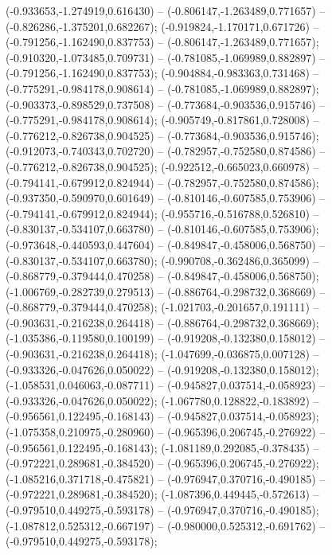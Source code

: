  (-0.933653,-1.274919,0.616430) -- (-0.806147,-1.263489,0.771657) -- (-0.826286,-1.375201,0.682267);
 (-0.919824,-1.170171,0.671726) -- (-0.791256,-1.162490,0.837753) -- (-0.806147,-1.263489,0.771657);
 (-0.910320,-1.073485,0.709731) -- (-0.781085,-1.069989,0.882897) -- (-0.791256,-1.162490,0.837753);
 (-0.904884,-0.983363,0.731468) -- (-0.775291,-0.984178,0.908614) -- (-0.781085,-1.069989,0.882897);
 (-0.903373,-0.898529,0.737508) -- (-0.773684,-0.903536,0.915746) -- (-0.775291,-0.984178,0.908614);
 (-0.905749,-0.817861,0.728008) -- (-0.776212,-0.826738,0.904525) -- (-0.773684,-0.903536,0.915746);
 (-0.912073,-0.740343,0.702720) -- (-0.782957,-0.752580,0.874586) -- (-0.776212,-0.826738,0.904525);
 (-0.922512,-0.665023,0.660978) -- (-0.794141,-0.679912,0.824944) -- (-0.782957,-0.752580,0.874586);
 (-0.937350,-0.590970,0.601649) -- (-0.810146,-0.607585,0.753906) -- (-0.794141,-0.679912,0.824944);
 (-0.955716,-0.516788,0.526810) -- (-0.830137,-0.534107,0.663780) -- (-0.810146,-0.607585,0.753906);
 (-0.973648,-0.440593,0.447604) -- (-0.849847,-0.458006,0.568750) -- (-0.830137,-0.534107,0.663780);
 (-0.990708,-0.362486,0.365099) -- (-0.868779,-0.379444,0.470258) -- (-0.849847,-0.458006,0.568750);
 (-1.006769,-0.282739,0.279513) -- (-0.886764,-0.298732,0.368669) -- (-0.868779,-0.379444,0.470258);
 (-1.021703,-0.201657,0.191111) -- (-0.903631,-0.216238,0.264418) -- (-0.886764,-0.298732,0.368669);
 (-1.035386,-0.119580,0.100199) -- (-0.919208,-0.132380,0.158012) -- (-0.903631,-0.216238,0.264418);
 (-1.047699,-0.036875,0.007128) -- (-0.933326,-0.047626,0.050022) -- (-0.919208,-0.132380,0.158012);
 (-1.058531,0.046063,-0.087711) -- (-0.945827,0.037514,-0.058923) -- (-0.933326,-0.047626,0.050022);
 (-1.067780,0.128822,-0.183892) -- (-0.956561,0.122495,-0.168143) -- (-0.945827,0.037514,-0.058923);
 (-1.075358,0.210975,-0.280960) -- (-0.965396,0.206745,-0.276922) -- (-0.956561,0.122495,-0.168143);
 (-1.081189,0.292085,-0.378435) -- (-0.972221,0.289681,-0.384520) -- (-0.965396,0.206745,-0.276922);
 (-1.085216,0.371718,-0.475821) -- (-0.976947,0.370716,-0.490185) -- (-0.972221,0.289681,-0.384520);
 (-1.087396,0.449445,-0.572613) -- (-0.979510,0.449275,-0.593178) -- (-0.976947,0.370716,-0.490185);
 (-1.087812,0.525312,-0.667197) -- (-0.980000,0.525312,-0.691762) -- (-0.979510,0.449275,-0.593178);
